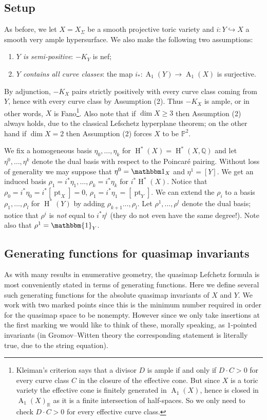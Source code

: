 \documentclass[11pt]{amsart}
\newcommand{\PP}{\mathbb P}
\renewcommand{\to}{\rightarrow}
\newcommand{\QQ}{\mathbb{Q}}
\newcommand{\HH}{\operatorname{H}}
\newcommand{\Achow}{\operatorname{A}}
\newcommand{\pt}{\operatorname{pt}}
\theoremstyle{definition}
\theoremstyle{definition}
\begin{document}
\subsection{Setup} \label{Subsection setup}
As before, we let $X=X_{\Sigma}$ be a smooth projective toric variety and $i \colon Y \hookrightarrow X$ a smooth very ample hypersurface. We also make the following two assumptions:
\begin{enumerate}
\item \emph{$Y$ is semi-positive}: $-K_Y$ is nef;
\item \emph{$Y$ contains all curve classes}: the map $i_* : \Achow_1(Y) \to \Achow_1(X)$ is surjective.
\end{enumerate}
By adjunction, $-K_X$ pairs strictly positively with every curve class coming from $Y$, hence with every curve class by Assumption (2). Thus $-K_X$ is ample, or in other words, $X$ is Fano\footnote{Kleiman's criterion says that a divisor $D$ is ample if and only if $D \cdot C > 0$ for every curve class $C$ in the closure of the effective cone. But since $X$ is a toric variety the effective cone is finitely generated in $\Achow_1(X)$, hence is closed in $\Achow_1(X)_{\mathbb{R}}$ as it is a finite intersection of half-spaces. So we only need to check $D \cdot C > 0$ for every effective curve class.}. Also note that if $\dim X \geq 3$ then Assumption (2) always holds, due to the classical Lefschetz hyperplane theorem; on the other hand if $\dim X = 2$ then Assumption (2) forces $X$ to be $\PP^2$.

We fix a homogeneous basis $\eta_0, \ldots, \eta_k$ for $\HH^*(X) = \HH^*(X,\QQ)$ and let $\eta^0, \ldots, \eta^k$ denote the dual basis with respect to the Poincar\'e pairing. Without loss of generality we may suppose that $\eta^0=\mathbbm 1_X$ and $\eta^1=[Y]$. We get an induced basis $\rho_1=i^*\eta_1, \ldots, \rho_k = i^* \eta_k$ for $i^*\HH^*(X)$. Notice that $\rho_0 = i^* \eta_0 = i^* [\pt_X] = 0$, $\rho_1 = i^* \eta_1 = [\pt_Y]$.  We can extend the $\rho_i$ to a basis $\rho_1, \ldots, \rho_l$ for $\HH^*(Y)$ by adding $\rho_{k+1}\ldots,\rho_{l}$. Let $\rho^1, \ldots, \rho^l$ denote the dual basis; notice that $\rho^i$ is \emph{not} equal to $i^* \eta^i$ (they do not even have the same degree!).  Note also that $\rho^1 = \mathbbm{1}_Y$.

\subsection{Generating functions for quasimap invariants}
As with many results in enumerative geometry, the quasimap Lefchetz formula is most conveniently stated in terms of generating functions. Here we define several such generating functions for the absolute quasimap invariants of $X$ and $Y$.  We work with two marked points since this is the minimum number required in order for the quasimap space to be nonempty. However since we only take insertions at the first marking we would like to think of these, morally speaking, as $1$-pointed invariants (in Gromov--Witten theory the corresponding statement is literally true, due to the string equation).
\end{document}
